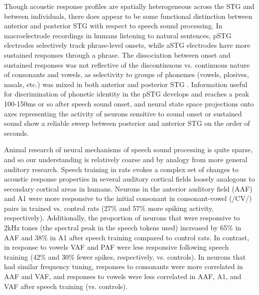 Though acoustic response profiles are spatially heterogeneous across the STG and between individuals\cite{mesgaraniPhoneticFeatureEncoding2014,hamiltonSpatialMapOnset2018a}, there does appear to be some functional distinction between anterior and posterior STG with respect to speech sound processing. In macroelectrode recordings in humans listening to natural sentences, pSTG electrodes selectively track phrase-level onsets, while aSTG electrodes have more sustained responses through a phrase. The dissociation between onset and sustained responses was not reflective of the discontinuous vs. continuous nature of consonants and vowels, as selectivity to groups of phonemes (vowels, plosives, nasals, etc.) was mixed in both anterior and posterior STG \cite{hamiltonSpatialMapOnset2018a}. Information useful for discrimination of phonetic identity in the pSTG develops and reaches a peak 100-150ms or so after speech sound onset\cite{mesgaraniPhoneticFeatureEncoding2014,changCategoricalSpeechRepresentation2010b}, and neural state space projections onto axes representing the activity of neurons sensitive to sound onset or sustained sound show a reliable sweep between posterior and anterior STG on the order of seconds. 

Animal research of neural mechanisms of speech sound processing is quite sparse, and so our understanding is relatively coarse and by analogy from more general auditory research. Speech training in rats evokes a complex set of changes to acoustic response properties in several auditory cortical fields loosely analogous to secondary cortical areas in humans\cite{engineerSpeechTrainingAlters2015a}. Neurons in the anterior auditory field (AAF) and A1 were more responsive to the initial consonant in consonant-vowel (/CV/) pairs in trained vs. control rats (27\% and 57\% more spiking activity, respectively). Additionally, the proportion of neurons that were responsive to 2kHz tones (the spectral peak in the speech tokens used) increased by 65\% in AAF and 38\% in A1 after speech training compared to control rats. In contrast, in response to vowels VAF and PAF were less responsive following speech training (42\% and 30\% fewer spikes, respectively, vs. controls). In neurons that had similar frequency tuning, responses to consonants were more correlated in AAF and VAF, and responses to vowels were less correlated in AAF, A1, and VAF after speech training (vs. controls)\cite{engineerSpeechTrainingAlters2015a}. 

